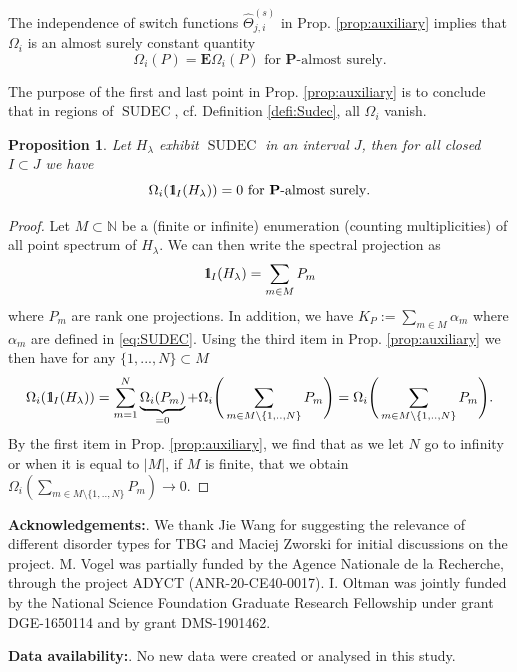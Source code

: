 \documentclass[reqno,12pt,letterpaper]{amsart}
\def\smallsection#1{\smallskip\noindent\textbf{#1}.}
\newtheorem{prop}[theo]{Proposition}
\numberwithin{equation}{section}
\def\indic{\operatorname{1\hskip-2.75pt\relax l}}
\begin{document}
\begin{appendix}
The independence of switch functions $\hat \Theta^{(s)}_{j,i}$ in Prop. \ref{prop:auxiliary} implies that $\Omega_i$ is an almost surely constant quantity
\begin{equation}
\label{eq:constant}
 \Omega_i(P)=\mathbf E \Omega_i(P) \text{ for }\mathbf P\text{-almost surely}.
 \end{equation}

The purpose of the first and last point in Prop. \ref{prop:auxiliary} is to conclude that in regions of $\operatorname{SUDEC}$, cf. Definition \ref{defi:Sudec}, all $\Omega_i$ vanish.
\begin{prop}
\label{prop:SUDEC}
Let $H_{\lambda}$ exhibit $\operatorname{SUDEC}$ in an interval $J$, then for all closed $I \subset J$ we have 
\[ \Omega_i(\indic_{I}(H_{\lambda}))=0\text{ for }\mathbf P\text{-almost surely}.\] 
\end{prop}
\begin{proof}
Let $M \subset \mathbb N$ be a (finite or infinite) enumeration (counting multiplicities) of all point spectrum of $H_{\lambda}$. We can then write the spectral projection as
\[ \indic_{I}(H_{\lambda}) = \sum_{m \in M} P_{m}\]
where $P_m$ are rank one projections. In addition, we have $K_P:=\sum_{m\in M} \alpha_{m}$ where $\alpha_{m}$ are defined in \eqref{eq:SUDEC}.
Using the third item in Prop. \ref{prop:auxiliary} we then have for any $\{1,...,N\} \subset M$
\[\Omega_i(\indic_{I}(H_{\lambda})) =\sum_{m =1}^N \underbrace{\Omega_i(P_{m})}_{=0} +\Omega_i\Bigg(\sum_{m \in M\setminus \{1,..,N\}} P_{m} \Bigg)= \Omega_i\Bigg(\sum_{m \in M\setminus \{1,..,N\}} P_{m} \Bigg). \]
By the first item in Prop. \ref{prop:auxiliary}, we find that as we let $N$ go to infinity or when it is equal to $\vert M \vert$, if $M$ is finite, that we obtain $\Omega_i(\sum_{m \in M\setminus \{1,..,N\}} P_{m} ) \to 0.$
\end{proof}




\smallsection{Acknowledgements:} We thank Jie Wang for suggesting the relevance of different disorder types for TBG and Maciej Zworski for initial discussions on the project. M. Vogel was partially funded by the Agence Nationale de la Recherche, through the project ADYCT (ANR-20-CE40-0017). I. Oltman was jointly funded by the National Science Foundation Graduate Research Fellowship under grant DGE-1650114 and by grant DMS-1901462.

\smallsection{Data availability:}  No new data were created or analysed in this study.
\end{appendix}
\end{document}
